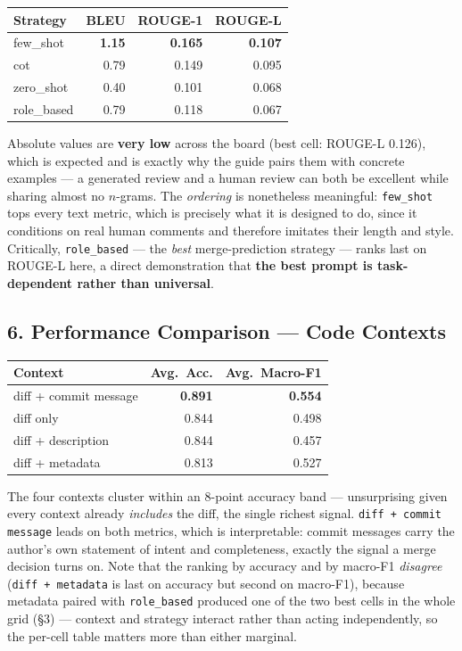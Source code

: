 \documentclass{experimentreport}
\begin{document}
{\begin{center}
\begin{tabular}{|l|r|r|r|}
\hline
\textbf{Strategy} & \textbf{BLEU} & \textbf{ROUGE-1} & \textbf{ROUGE-L} \\
\hline
few\_shot   & \textbf{1.15} & \textbf{0.165} & \textbf{0.107} \\
cot         & 0.79 & 0.149 & 0.095 \\
zero\_shot  & 0.40 & 0.101 & 0.068 \\
role\_based & 0.79 & 0.118 & 0.067 \\
\hline
\end{tabular}
\end{center}
\noindent Absolute values are \textbf{very low} across the board (best cell: ROUGE-L 0.126), which
is expected and is exactly why the guide pairs them with concrete examples --- a generated review
and a human review can both be excellent while sharing almost no $n$-grams. The \emph{ordering} is
nonetheless meaningful: \texttt{few\_shot} tops every text metric, which is precisely what it is
designed to do, since it conditions on real human comments and therefore imitates their length and
style. Critically, \texttt{role\_based} --- the \emph{best} merge-prediction strategy --- ranks last
on ROUGE-L here, a direct demonstration that \textbf{the best prompt is task-dependent rather than
universal}.

\subsection*{6. Performance Comparison --- Code Contexts}

\begin{center}
\begin{tabular}{|l|r|r|}
\hline
\textbf{Context} & \textbf{Avg.\ Acc.} & \textbf{Avg.\ Macro-F1} \\
\hline
diff + commit message & \textbf{0.891} & \textbf{0.554} \\
diff only              & 0.844 & 0.498 \\
diff + description     & 0.844 & 0.457 \\
diff + metadata         & 0.813 & 0.527 \\
\hline
\end{tabular}
\end{center}
\noindent The four contexts cluster within an 8-point accuracy band --- unsurprising given every
context already \emph{includes} the diff, the single richest signal. \texttt{diff + commit message}
leads on both metrics, which is interpretable: commit messages carry the author's own statement of
intent and completeness, exactly the signal a merge decision turns on. Note that the ranking by
accuracy and by macro-F1 \emph{disagree} (\texttt{diff + metadata} is last on accuracy but second on
macro-F1), because metadata paired with \texttt{role\_based} produced one of the two best cells in
the whole grid (\S3) --- context and strategy interact rather than acting independently, so the
per-cell table matters more than either marginal.

}
\end{document}
